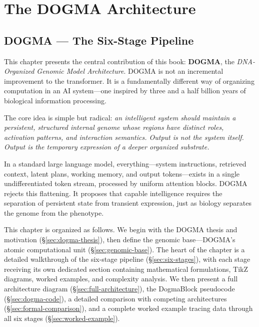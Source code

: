 
\part{The DOGMA Architecture}

\chapter{DOGMA --- The Six-Stage Pipeline}
\label{ch:dogma-architecture}


\noindent
This chapter presents the central contribution of this book: \textbf{DOGMA}, the \emph{DNA-Organized Genomic Model Architecture}. DOGMA is not an incremental improvement to the transformer. It is a fundamentally different way of organizing computation in an AI system---one inspired by three and a half billion years of biological information processing.

The core idea is simple but radical: \emph{an intelligent system should maintain a persistent, structured internal genome whose regions have distinct roles, activation patterns, and interaction semantics. Output is not the system itself. Output is the temporary expression of a deeper organized substrate.}

In a standard large language model, everything---system instructions, retrieved context, latent plans, working memory, and output tokens---exists in a single undifferentiated token stream, processed by uniform attention blocks. DOGMA rejects this flattening. It proposes that capable intelligence requires the separation of persistent state from transient expression, just as biology separates the genome from the phenotype.

This chapter is organized as follows. We begin with the DOGMA thesis and motivation (\S\ref{sec:dogma-thesis}), then define the genomic base---DOGMA's atomic computational unit (\S\ref{sec:genomic-base}). The heart of the chapter is a detailed walkthrough of the six-stage pipeline (\S\ref{sec:six-stages}), with each stage receiving its own dedicated section containing mathematical formulations, TikZ diagrams, worked examples, and complexity analysis. We then present a full architecture diagram (\S\ref{sec:full-architecture}), the DogmaBlock pseudocode (\S\ref{sec:dogma-code}), a detailed comparison with competing architectures (\S\ref{sec:formal-comparison}), and a complete worked example tracing data through all six stages (\S\ref{sec:worked-example}).

